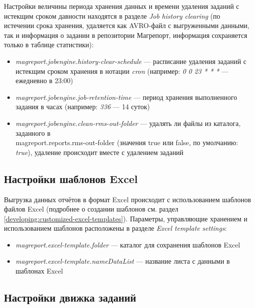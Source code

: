 \documentclass[../user-manual.tex]{subfiles}
\begin{document}
	Настройки величины периода хранения данных и времени удаления заданий с истекщим сроком давности находятся в разделе \textit{Job history clearing} (по истечении срока хранения, удаляется как AVRO-файл с выгруженными данными, так и информация о задании в репозитории Магрепорт, информация сохраняется только в таблице статистики):
	
	\begin{itemize}
		\item \textit{magreport.jobengine.history-clear-schedule} --- расписание удаления заданий с истекщим сроком хранения в нотации \textit{cron} (например: \textit{0 0 23 * * *} --- ежедневно в 23:00)
		
		\item \textit{magreport.jobengine.job-retention-time} --- период хранения выполненного задания в часах (например: \textit{336} --- 14 суток)
		
		\item \textit{magreport.jobengine.clean-rms-out-folder} --- удалять ли файлы из каталога, заданного в \\
		magreport.reports.rms-out-folder (значения true или false, по умолчанию: \textit{true}), удаление происходит вместе с удалением заданий
		
	\end{itemize}
	
	\subsection{Настройки шаблонов Excel}\label{subsection:excel-template-settings}
	
	Выгрузка данных отчётов в формат Excel происходит с использованием шаблонов файлов Excel (подробнее о создании шаблонов см. раздел \ref{developing:customized-excel-templates}). Параметры, управляющие хранением и использованием шаблонов расположены в разделе \textit{Excel template settings}:
	
	\begin{itemize}
		\item \textit{magreport.excel-template.folder} --- каталог для сохранения шаблонов Excel
		
		\item \textit{magreport.excel-template.nameDataList} --- название листа с данными в шаблонах Excel
	\end{itemize}
	
	\subsection{Настройки движка заданий}
	
\end{document}
